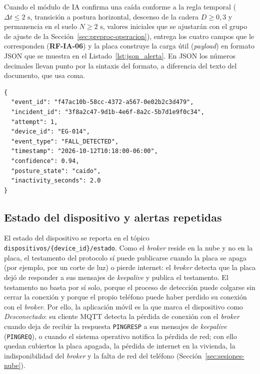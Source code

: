 \documentclass[12pt,a4paper,oneside]{book}
\theoremstyle{plain}
\theoremstyle{definition}
\theoremstyle{remark}
\begin{document}
Cuando el módulo de IA confirma una caída conforme a la regla temporal ($\Delta t \leq 2\text{ s}$, transición a postura horizontal, descenso de la cadera $D \geq 0{,}3$ y permanencia en el suelo $N \geq 2\text{ s}$, valores iniciales que se ajustarán con el grupo de ajuste de la Sección~\ref{sec:preproc-operacion}), entrega los cuatro campos que le corresponden (\textbf{RF-IA-06}) y la placa construye la carga útil (\textit{payload}) en formato JSON que se muestra en el Listado~\ref{lst:json_alerta}. En JSON los números decimales llevan punto por la sintaxis del formato, a diferencia del texto del documento, que usa coma.

\renewcommand{\lstlistingname}{Listado}
\begin{lstlisting}[caption={Estructura del paquete JSON publicado por la Raspberry Pi 5 ante una caída detectada.}, label={lst:json_alerta}]
{
  "event_id": "f47ac10b-58cc-4372-a567-0e02b2c3d479",
  "incident_id": "3f8a2c47-9d1b-4e6f-8a2c-5b7d1e9f0c34",
  "attempt": 1,
  "device_id": "EG-014",
  "event_type": "FALL_DETECTED",
  "timestamp": "2026-10-12T10:18:00-06:00",
  "confidence": 0.94,
  "posture_state": "caido",
  "inactivity_seconds": 2.0
}
\end{lstlisting}

\subsection{Estado del dispositivo y alertas repetidas}
\label{sec:estado-dispositivo}

El estado del dispositivo se reporta en el tópico \texttt{dispositivos/\{device\_id\}/estado}. Como el \textit{broker} reside en la nube y no en la placa, el testamento del protocolo sí puede publicarse cuando la placa se apaga (por ejemplo, por un corte de luz) o pierde internet: el \textit{broker} detecta que la placa dejó de responder a sus mensajes de \textit{keepalive} y publica el testamento. El testamento no basta por sí solo, porque el proceso de detección puede colgarse sin cerrar la conexión y porque el propio teléfono puede haber perdido su conexión con el \textit{broker}. Por ello, la aplicación móvil es la que marca el dispositivo como \textit{Desconectado}: su cliente MQTT detecta la pérdida de conexión con el \textit{broker} cuando deja de recibir la respuesta \texttt{PINGRESP} a sus mensajes de \textit{keepalive} (\texttt{PINGREQ}), o cuando el sistema operativo notifica la pérdida de red; con ello quedan cubiertos la placa apagada, la pérdida de internet en la vivienda, la indisponibilidad del \textit{broker} y la falta de red del teléfono (Sección~\ref{sec:sesiones-nube}).
\end{document}
